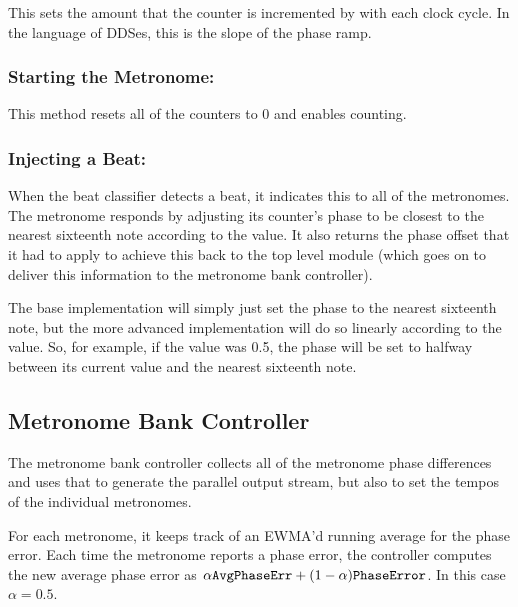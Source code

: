 \documentclass[letterpaper]{article}
\begin{document}
        This sets the amount that the counter is incremented by with each clock
        cycle.  In the language of DDSes, this is the slope of the phase ramp.


        \subsubsection{Starting the Metronome: }

        This method resets all of the counters to 0 and enables counting.


        \subsubsection{Injecting a Beat: }
        
        When the beat classifier detects a beat, it indicates this to all of the
        metronomes.  The metronome responds by adjusting its counter's phase to be
        closest to the nearest sixteenth note according to the 
        value.  It also returns the phase offset that it had to apply to achieve
        this back to the top level module (which goes on to deliver this
        information to the metronome bank controller).

        The base implementation will simply just set the phase to the nearest
        sixteenth note, but the more advanced implementation will do so linearly
        according to the  value.  So, for example, if the value
        was 0.5, the phase will be set to halfway between its current value and the
        nearest sixteenth note.


    \subsection{Metronome Bank Controller}

        The metronome bank controller collects all of the metronome phase
        differences and uses that to generate the parallel output stream, but also
        to set the tempos of the individual metronomes.

        For each metronome, it keeps track of an EWMA'd running average for the
        phase error.  Each time the metronome reports a phase error, the controller
        computes the new average phase error as $\alpha \textrm{\texttt{AvgPhaseErr}}
        + (1-\alpha) \textrm{\texttt{PhaseError}}$.  In this case $\alpha=0.5$.
\end{document}
